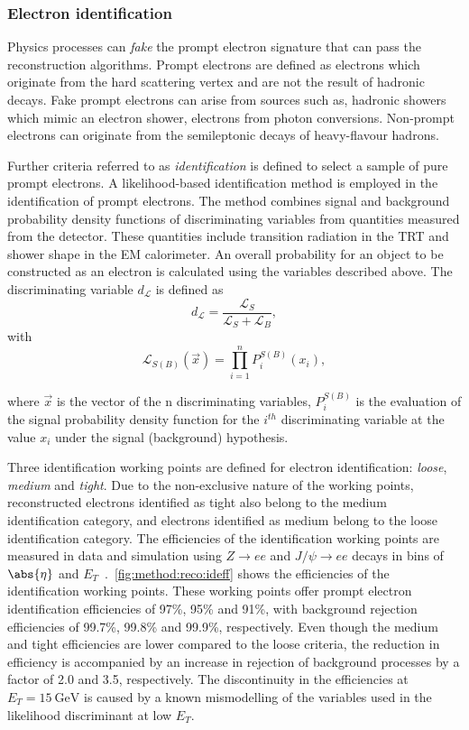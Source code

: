 \subsubsection{Electron identification}
Physics processes can \emph{fake} the prompt electron signature that can pass the reconstruction algorithms. Prompt electrons are defined as electrons which originate from the hard scattering vertex and are not the result of hadronic decays. Fake prompt electrons can arise from sources such as, hadronic showers which mimic an electron shower, electrons from photon conversions. Non-prompt electrons can originate from the semileptonic decays of heavy-flavour hadrons.

Further criteria referred to as \emph{identification} is defined to select a sample of pure prompt electrons. A likelihood-based identification method is employed in the identification of prompt electrons. The method combines signal and background probability density functions of discriminating variables from quantities measured from the detector. These quantities include transition radiation in the TRT and shower shape in the EM calorimeter. An overall probability for an object to be constructed as an electron is calculated using the variables described above. The discriminating variable $d_\mathcal{L}$ is defined as
\begin{equation}
    d_{\mathcal{L}} = \frac{\mathcal{L}_S}{\mathcal{L}_S + \mathcal{L}_B},  
\end{equation}
with 
\begin{equation}
    \mathcal{L}_{S(B)}(\overrightarrow{x}) = \prod_{i=1}^{n} P_{i}^{S(B)} (x_{i}),
\end{equation}

where $\overrightarrow{x}$ is the vector of the n discriminating variables, $P_{i}^{S(B)}$ is the evaluation of the signal probability density function for the $i^{th}$ discriminating variable at the value $x_i$ under the signal (background) hypothesis. 

Three identification working points are defined for electron identification: \emph{loose}, \emph{medium} and \emph{tight}. Due to the non-exclusive nature of the working points, reconstructed electrons identified as tight also belong to the medium identification category, and electrons identified as medium belong to the loose identification category. The efficiencies of the identification working points are measured in data and simulation using $Z \rightarrow ee$ and $J/\psi \rightarrow ee$ decays in bins of $\abs{\eta}$ and $E_T$~\cite{Aad:2019tso}.~\cref{fig:method:reco:ideff} shows the efficiencies of the identification working points. These working points offer prompt electron identification efficiencies of 97\%, 95\% and 91\%, with background rejection efficiencies of 99.7\%, 99.8\% and 99.9\%, respectively. Even though the medium and tight efficiencies are lower compared to the loose criteria, the reduction in efficiency is accompanied by an increase in rejection of background processes by a factor of 2.0 and 3.5, respectively. The discontinuity in the efficiencies at $E_T = \SI{15}{\giga\electronvolt}$ is caused by a known mismodelling of the variables used in the likelihood discriminant at low $E_T$. 

